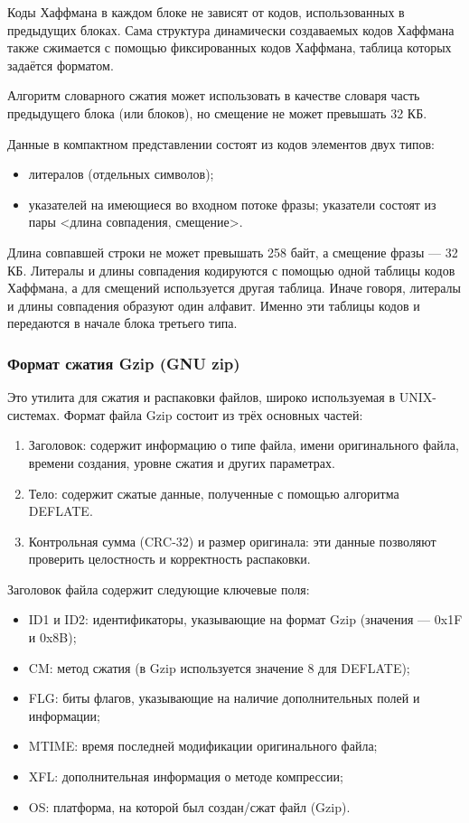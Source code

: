 \documentclass[12pt]{article}
\begin{document}
Коды Хаффмана в каждом блоке не зависят от кодов, использованных в предыдущих блоках.
Сама структура динамически создаваемых кодов Хаффмана также сжимается с помощью фиксированных кодов Хаффмана,
таблица которых задаётся форматом.

Алгоритм словарного сжатия может использовать в качестве словаря часть предыдущего блока (или блоков),
но смещение не может превышать 32 КБ.

Данные в компактном представлении состоят из кодов элементов двух типов:

\begin{itemize}[label=-]
    \item литералов (отдельных символов);
    \item указателей на имеющиеся во входном потоке фразы; указатели состоят из пары
          <длина совпадения, смещение>.
\end{itemize}

Длина совпавшей строки не может превышать 258 байт, а смещение фразы — 32 КБ.
Литералы и длины совпадения кодируются с помощью одной таблицы кодов Хаффмана,
а для смещений используется другая таблица.
Иначе говоря, литералы и длины совпадения образуют один алфавит.
Именно эти таблицы кодов и передаются в начале блока третьего типа.

\subsubsection{Формат сжатия Gzip (GNU zip)}

Это утилита для сжатия и распаковки файлов, широко используемая в UNIX-системах.
Формат файла Gzip состоит из трёх основных частей:

\begin{enumerate}
    \item Заголовок: содержит информацию о типе файла, имени оригинального файла, времени создания, уровне сжатия и других параметрах.
    \item Тело: содержит сжатые данные, полученные с помощью алгоритма DEFLATE.
    \item Контрольная сумма (CRC-32) и размер оригинала: эти данные позволяют проверить целостность и корректность распаковки.
\end{enumerate}

Заголовок файла содержит следующие ключевые поля:

\begin{itemize}[label=-]
    \item ID1 и ID2: идентификаторы, указывающие на формат Gzip (значения — 0x1F и 0x8B);
    \item CM: метод сжатия (в Gzip используется значение 8 для DEFLATE);
    \item FLG: биты флагов, указывающие на наличие дополнительных полей и информации;
    \item MTIME: время последней модификации оригинального файла;
    \item XFL: дополнительная информация о методе компрессии;
    \item OS: платформа, на которой был создан/сжат файл (Gzip).
\end{itemize}
\end{document}
